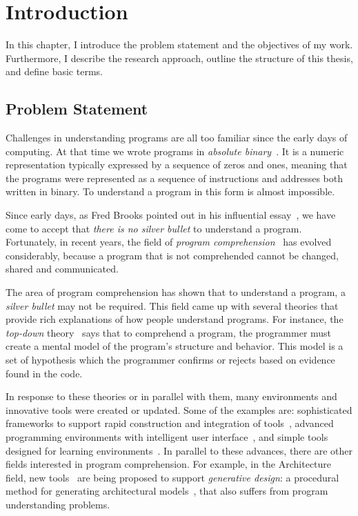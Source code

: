 

\chapter{Introduction}
\label{chapter:introduction}

In this chapter, I introduce the problem statement and the objectives of my work. Furthermore, I describe the research approach, outline the structure of this thesis, and define basic terms.

\section{Problem Statement}

Challenges in understanding programs are all too familiar since the early days of computing. At that time we wrote programs in \textit{absolute binary}~\citep{hamming2003art}. It is a numeric representation typically expressed by a sequence of zeros and ones, meaning that the programs were represented as a sequence of instructions and addresses both written in binary. To understand a program in this form is almost impossible.

Since early days, as Fred Brooks pointed out in his influential essay~\citep{bullet1987essence}, we have come to accept that \textit{there is no silver bullet} to understand a program. Fortunately, in recent years, the field of \textit{program comprehension}~\citep{rugaber1995program} has evolved considerably, because a program that is not comprehended cannot be changed, shared and communicated.

The area of program comprehension has shown that to understand a program, a \textit{silver bullet} may not be required. This field came up with several theories that provide rich explanations of how people understand programs. For instance, the \textit{top-down} theory~\citep{brooks1977towards} says that to comprehend a program, the programmer must create a mental model of the program's structure and behavior. This model is a set of hypothesis which the programmer confirms or rejects based on evidence found in the code.

In response to these theories or in parallel with them, many environments and innovative tools were created or updated. Some of the examples are: sophisticated frameworks to support rapid construction and integration of tools~\citep{DesRivieres2004}, advanced programming environments with intelligent user interface~\citep{carlson2005eclipse,boudreau2002netbeans,intellij2001intellij,guckenheimer2006software}, and simple tools designed for learning environments~\citep{papert1980mindstorms,Kay1993,Reas2006,findler2002drscheme,GuoSIGCSE2013,mcdirmid2013usable}. In parallel to these advances, there are other fields interested in program comprehension. For example, in the Architecture field, new tools~\citep{aish2012designscript,lopes2011portable} are being proposed to support \textit{generative design}: a procedural method for generating architectural models~\citep{mccormack2004generative}, that also suffers from program understanding problems.

